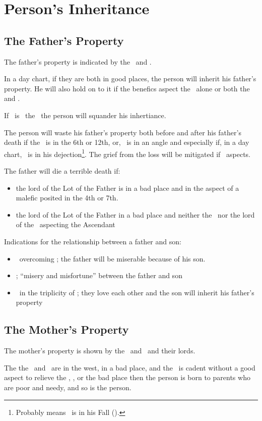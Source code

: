 \section{Person's Inheritance}

\subsection{The Father's Property}
The father's property is indicated by the \Sun\, and \Saturn.

In a day chart, if they are both in good places, the person will inherit his father's property. He will also hold on to it if  the benefics aspect the \Sun\, alone or both the \Sun\, and \Saturn.

If  \Mars\ is \Square\, the \Sun\, the person will squander his inhertiance. 

The person will waste his father's property both before and after his father's death if the \Sun\, is in the 6th or 12th, or, \Mars\, is in an angle and especially if, in a day chart, \Saturn\, is in his dejection\footnote{Probably means \Saturn\, is in his Fall (\Aries).}. The grief from the loss will be mitigated if \Jupiter\, aspects.

The father will die a terrible death if:
\begin{itemize}[topsep=0em,itemsep=0em]
\item the lord of the Lot of the Father is in a bad place and in the aspect of a malefic posited in the 4th or 7th.

\item the lord of the Lot of the Father in a bad place and neither the \Sun\, nor the lord of the \Sun\, aspecting the Ascendant
\end{itemize}

Indications for the relationship between a father and son:
\begin{itemize}[topsep=0em,itemsep=0em]

\item  \Jupiter\, overcoming \Saturn; the father will be miserable because of his son.

\item \Jupiter\Opposition\Sun; ``misery and misfortune'' between the father and son

\item \Saturn\, in the triplicity of \Jupiter; they love each other and the son will inherit his father's property
\end{itemize}

\subsection{The Mother's Property}
The mother's property is shown by the \Moon\, and \Venus\, and their lords.

The the \Moon\, and \Venus\, are in the west, in a bad place, and the \Sun\, is cadent without a good aspect to relieve the \Moon, \Venus, or the bad place then the person is born to parents who are poor and needy, and so is the person.




